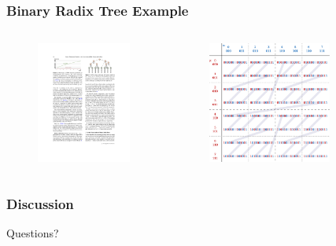\documentclass{beamer}
\begin{document}
\begin{frame}
  \frametitle{Binary Radix Tree Example}
  
\begin{columns}[t]

\begin{figure}
\includegraphics[height=40mm]{BinaryRadixTree.pdf}
\end{figure}

\begin{figure}
\includegraphics[height=40mm]{Z-curve.pdf}
\end{figure}
\end{columns}
\end{frame}

\begin{frame}
  \frametitle{Discussion}
Questions?
\end{frame}
\end{document}
